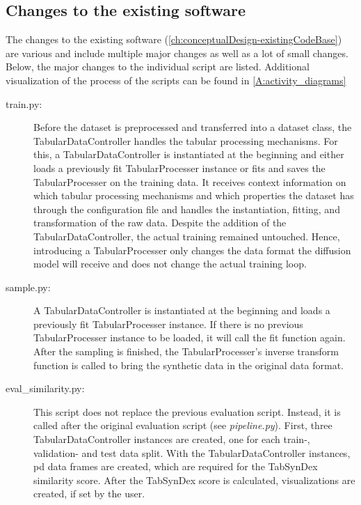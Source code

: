 \subsection{Changes to the existing software}
\label{ch:methods-changes}
The changes to the existing software (\autoref{ch:conceptualDesign-existingCodeBase}) are various and include multiple major changes as well as a lot of small changes.
Below, the major changes to the individual script are listed.
Additional visualization of the process of the scripts can be found in \autoref{A:activity_diagrams}

\begin{description}
	\item[train.py:]
		Before the dataset is preprocessed and transferred into a dataset class, the TabularDataController handles the tabular processing mechanisms.
		For this, a TabularDataController is instantiated at the beginning and either loads a previously fit TabularProcesser instance or fits and saves the TabularProcesser on the training data.
		It receives context information on which tabular processing mechanisms and which properties the dataset has through the configuration file and handles the
		instantiation, fitting, and transformation of the raw data.
		Despite the addition of the TabularDataController, the actual training remained untouched.
		Hence, introducing a TabularProcesser only changes the data format the diffusion model will receive and does not change the actual training loop.

	\item[sample.py:]
		A TabularDataController is instantiated at the beginning and loads a previously fit TabularProcesser instance.
		If there is no previous TabularProcesser instance to be loaded, it will call the fit function again.
		After the sampling is finished, the TabularProcesser's inverse transform function is called to bring the synthetic data in the original data format.

	\item[eval\_similarity.py:]
		This script does not replace the previous evaluation script.
		Instead, it is called after the original evaluation script (see \textit{pipeline.py}).
		First, three TabularDataController instances are created, one for each train-, validation- and test data split.
		With the TabularDataController instances, \gls{pd} \cite{mckinney-proc-scipy-2010} data frames are created, which are required for the TabSynDex similarity score.
		After the TabSynDex score is calculated, visualizations are created, if set by the user.


\end{description}

